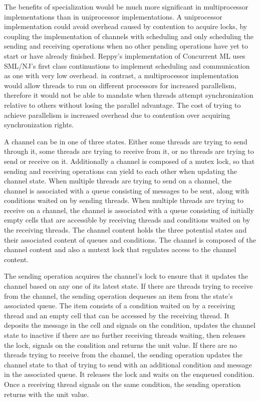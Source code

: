 \documentclass{article}
\begin{document}
The benefits of specialization would be much more significant in multiprocessor
implementations than in uniprocessor implementations. A uniprocessor
implementation could avoid overhead caused by contention to acquire locks, by coupling the
implementation of channels with scheduling and only scheduling the sending and receiving
operations when no other pending operations have yet to start or have already finished.
Reppy's implementation of
Concurrent ML uses SML/NJ's first class continuations to implement scheduling and communication
as one with very low overhead. in contrast, a multiprocessor
implementation would allow threads to run
on different processors for increased parallelism,
therefore it would not be able to mandate when
threads attempt synchronization relative to others without losing the parallel advantage.
The cost of trying to achieve parallelism
is increased overhead due to contention over acquiring
synchronization rights. 

A channel can be in one of three states.  Either some threads are trying to send through it,
some threads are trying to receive from it, or no threads are trying to send or receive on it.
Additionally a channel is composed of a mutex lock,
so that sending and receiving operations can yield
to each other when updating the channel state. When multiple threads are trying to send on a
channel, the channel is associated with a queue consisting of messages to be sent, along with
conditions waited on by sending threads. When multiple threads are trying to receive on a
channel, the channel is associated with a queue consisting of
initially empty cells that are accessible
by receiving threads and conditions waited on by
the receiving threads. The channel content holds the
three potential states and their associated content of queues and conditions.
The channel is composed of the channel content and also a mutext lock that regulates access to
the channel content.

The sending operation acquires the channel's lock to
ensure that it updates the channel based on
any one of its latest state.  If there are threads trying
to receive from the channel, the sending 
operation dequeues an item from the state's associated queue.  The item consists of a condition
waited on by a receiving thread and an empty cell that can be accessed by the receiving thread.
It deposits the message in the cell and signals on the condition, updates the channel state to
inactive if there are no further receiving threads waiting, then releases the lock, signals on
the condition and returns the unit value.  If there are no threads trying to receive from the
channel, the sending operation updates the channel state to that of trying to send with an
additional condition and message in the associated queue.  It releases the lock and waits on
the enqueued condition.  Once a receiving thread signals on the same condition, the sending 
operation returns with the unit value.
\end{document}
